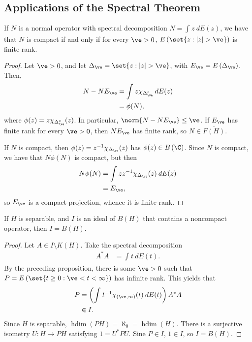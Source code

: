 \documentclass[10pt]{mypackage}
\begin{document}
\subsection{Applications of the Spectral Theorem}%
\begin{proposition}
  If $N$ is a normal operator with spectral decomposition $N = \int_{}^{} z\:dE(z)$, we have that $N$ is compact if and only if for every $\ve > 0$, $E\left( \set{z : \left\vert z \right\vert > \ve} \right)$ is finite rank.
\end{proposition}
\begin{proof}
  Let $\ve > 0$, and let $\Delta_{\ve} = \set{z : \left\vert z \right\vert > \ve}$, with $E_{\ve} = E\left( \Delta_{\ve} \right)$. Then,
  \begin{align*}
    N-NE_{\ve} &= \int_{}^{} z\chi_{\Delta_{\ve}^{c}}\:dE(z)\\
               &= \phi(N),
  \end{align*}
  where $\phi(z) = z\chi_{\Delta_{\ve}^{c}}(z)$. In particular, $\norm{N-NE_{\ve}}\leq \ve$. If $E_{\ve}$ has finite rank for every $\ve > 0$, then $NE_{\ve}$ has finite rank, so $N\in \overline{F\left( H \right)}$.

  If $N$ is compact, then $\phi(z) = z^{-1}\chi_{\Delta_{\ve}}(z)$ has $\phi(z)\in B\left( \C \right)$. Since $N$ is compact, we have that $N\phi(N)$ is compact, but then
  \begin{align*}
    N\phi(N) &= \int_{}^{} zz^{-1}\chi_{\Delta_{\ve}}(z)\:dE(z)\\
             &= E_{\ve},
  \end{align*}
  so $E_{\ve}$ is a compact projection, whence it is finite rank.
\end{proof}
\begin{theorem}
  If $H$ is separable, and $I$ is an ideal of $B(H)$ that contains a noncompact operator, then $I = B(H)$.
\end{theorem}
\begin{proof}
  Let $A\in I\setminus K(H)$. Take the spectral decomposition
  \begin{align*}
    A^{\ast}A &= \int_{}^{} t\:dE(t).
  \end{align*}
  By the preceding proposition, there is some $\ve > 0$ such that $P = E\left( \set{t\geq 0: \ve < t < \infty} \right)$ has infinite rank. This yields that
  \begin{align*}
    P &= \left( \int_{}^{} t^{-1}\chi_{\left( \ve,\infty \right)}(t)\:dE(t) \right)A^{\ast}A\\
      &\in I.
  \end{align*}
  Since $H$ is separable, $\operatorname{hdim}\left( PH \right) = \aleph_0 = \operatorname{hdim}\left( H \right)$. There is a surjective isometry $U\colon H\rightarrow PH$ satisfying $1 = U^{\ast}PU$. Sine $P\in I$, $1\in I$, so $I = B(H)$.
\end{proof}
\end{document}
